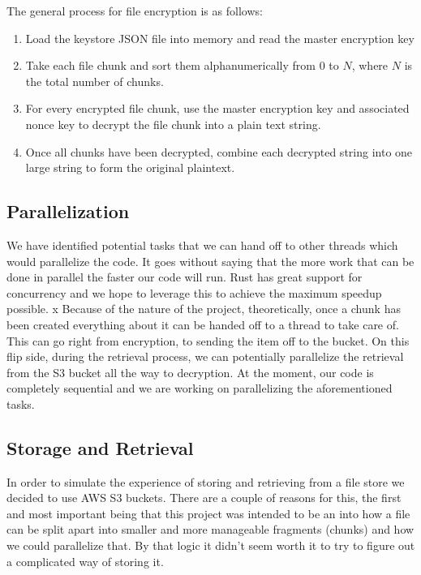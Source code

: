 \documentclass[conference]{IEEEtran}
\begin{document}
\medskip
\indent The general process for file encryption is as follows:
\begin{enumerate}
	\item Load the keystore JSON file into memory and read the master encryption key
	\item
		Take each file chunk and sort them alphanumerically from 0 to $N$, where
		$N$ is the total number of chunks.
	\item
		For every encrypted file chunk, use the master encryption key and associated
		nonce key to decrypt the file chunk into a plain text string.
	\item
		Once all chunks have been decrypted, combine each decrypted string into one
		large string to form the original plaintext.
\end{enumerate}

\subsection{Parallelization}

We have identified potential tasks that we can hand off to other threads which would parallelize the code.
It goes without saying that the more work that can be done in parallel the faster our code will run.
Rust has great support for concurrency and we hope to leverage this to achieve the maximum speedup possible.
x
Because of the nature of the project, theoretically, once a chunk has been created everything about it can be handed off to a thread to take care of.
This can go right from encryption, to sending the item off to the bucket.
On this flip side, during the retrieval process, we can potentially parallelize the retrieval from the S3 bucket all the way to decryption.
At the moment, our code is completely sequential and we are working on parallelizing the aforementioned tasks.

\subsection{Storage and Retrieval}

In order to simulate the experience of storing and retrieving from a file store we decided to use AWS S3 buckets.
There are a couple of reasons for this, the first and most important being that this project was intended to be an
into how a file can be split apart into smaller and more manageable fragments (chunks) and how we could parallelize that.
By that logic it didn't seem worth it to try to figure out a complicated way of storing it.
\end{document}
